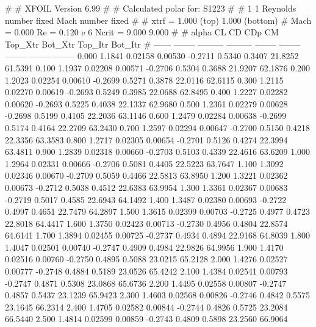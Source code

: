 #  
#       XFOIL         Version 6.99
#  
# Calculated polar for: S1223                                           
#  
# 1 1 Reynolds number fixed          Mach number fixed         
#  
# xtrf =   1.000 (top)        1.000 (bottom)  
# Mach =   0.000     Re =     0.120 e 6     Ncrit =   9.000  9.000
#  
#   alpha    CL        CD       CDp       CM     Top_Xtr  Bot_Xtr  Top_Itr  Bot_Itr
#  ------ -------- --------- --------- -------- -------- -------- -------- --------
   0.000   1.1841   0.02158   0.00530  -0.2711   0.5340   0.3407  21.8252  61.5391
   0.100   1.1937   0.02208   0.00571  -0.2706   0.5304   0.3688  21.9207  62.1876
   0.200   1.2023   0.02254   0.00610  -0.2699   0.5271   0.3878  22.0116  62.6115
   0.300   1.2115   0.02270   0.00619  -0.2693   0.5249   0.3985  22.0688  62.8495
   0.400   1.2227   0.02282   0.00620  -0.2693   0.5225   0.4038  22.1337  62.9680
   0.500   1.2361   0.02279   0.00628  -0.2698   0.5199   0.4105  22.2036  63.1146
   0.600   1.2479   0.02284   0.00638  -0.2699   0.5174   0.4164  22.2709  63.2430
   0.700   1.2597   0.02294   0.00647  -0.2700   0.5150   0.4218  22.3356  63.3583
   0.800   1.2717   0.02305   0.00654  -0.2701   0.5126   0.4274  22.3994  63.4811
   0.900   1.2839   0.02318   0.00660  -0.2703   0.5103   0.4339  22.4616  63.6209
   1.000   1.2964   0.02331   0.00666  -0.2706   0.5081   0.4405  22.5223  63.7647
   1.100   1.3092   0.02346   0.00670  -0.2709   0.5059   0.4466  22.5813  63.8950
   1.200   1.3221   0.02362   0.00673  -0.2712   0.5038   0.4512  22.6383  63.9954
   1.300   1.3361   0.02367   0.00683  -0.2719   0.5017   0.4585  22.6943  64.1492
   1.400   1.3487   0.02380   0.00693  -0.2722   0.4997   0.4651  22.7479  64.2897
   1.500   1.3615   0.02399   0.00703  -0.2725   0.4977   0.4723  22.8018  64.4417
   1.600   1.3750   0.02423   0.00713  -0.2730   0.4956   0.4804  22.8574  64.6141
   1.700   1.3894   0.02455   0.00725  -0.2737   0.4934   0.4894  22.9168  64.8039
   1.800   1.4047   0.02501   0.00740  -0.2747   0.4909   0.4984  22.9826  64.9956
   1.900   1.4170   0.02516   0.00760  -0.2750   0.4895   0.5088  23.0215  65.2128
   2.000   1.4276   0.02527   0.00777  -0.2748   0.4884   0.5189  23.0526  65.4242
   2.100   1.4384   0.02541   0.00793  -0.2747   0.4871   0.5308  23.0868  65.6736
   2.200   1.4495   0.02558   0.00807  -0.2747   0.4857   0.5437  23.1239  65.9423
   2.300   1.4603   0.02568   0.00826  -0.2746   0.4842   0.5575  23.1645  66.2314
   2.400   1.4705   0.02582   0.00844  -0.2744   0.4826   0.5725  23.2084  66.5440
   2.500   1.4814   0.02599   0.00859  -0.2743   0.4809   0.5898  23.2560  66.9064
